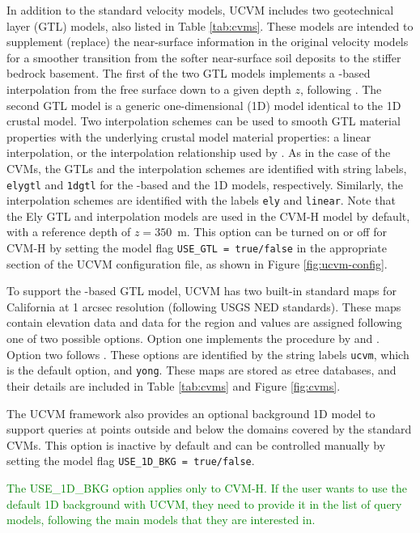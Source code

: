 In addition to the standard velocity models, UCVM includes two geotechnical layer (GTL) models, also listed in Table \ref{tab:cvms}. These models are intended to supplement (replace) the near-surface information in the original velocity models for a smoother transition from the softer near-surface soil deposits to the stiffer bedrock basement. The first of the two GTL models implements a \vsthirty-based interpolation from the free surface down to a given depth $z$, following \citet{Ely_2010_AGU}. The second GTL model is a generic one-dimensional (1D) model identical to the 1D crustal model. Two interpolation schemes can be used to smooth GTL material properties with the underlying crustal model material properties: a linear interpolation, or the interpolation relationship used by \citet{Ely_2010_AGU}. As in the case of the CVMs, the GTLs and the interpolation schemes are identified with string labels, \texttt{elygtl} and \texttt{1dgtl} for the \vsthirty-based and the 1D models, respectively. Similarly, the interpolation schemes are identified with the labels \texttt{ely} and \texttt{linear}. Note that the Ely GTL and interpolation models are used in the CVM-H model by default, with a reference depth of $z=350$~m. This option can be turned on or off for CVM-H by setting the model flag \texttt{USE\_GTL = true/false} in the appropriate section of the UCVM configuration file, as shown in Figure \ref{fig:ucvm-config}.

To support the \vsthirty-based GTL model, UCVM has two built-in standard maps for California at 1 arcsec resolution (following USGS NED standards). These maps contain elevation data and \vsthirty{} data for the region and \vsthirty{} values are assigned following one of two possible options. Option one implements the procedure by \citet{Wills_2006_BSSA} and \citet{Wald_2007_BSSA}. Option two follows \citet{Yong_2012_BSSA}. These options are identified by the string labels \texttt{ucvm}, which is the default option, and \texttt{yong}. These maps are stored as etree databases, and their details are included in Table \ref{tab:cvms} and Figure \ref{fig:cvms}.

The UCVM framework also provides an optional background 1D model to support queries at points outside and below the domains covered by the standard CVMs. This option is inactive by default and can be controlled manually by setting the model flag \texttt{USE\_1D\_BKG = true/false}.

\textcolor{green}{The USE\_1D\_BKG option applies only to CVM-H. If the user wants to use the default 1D background with UCVM, they need to provide it in the list of query models, following the main models that they are interested in.}


